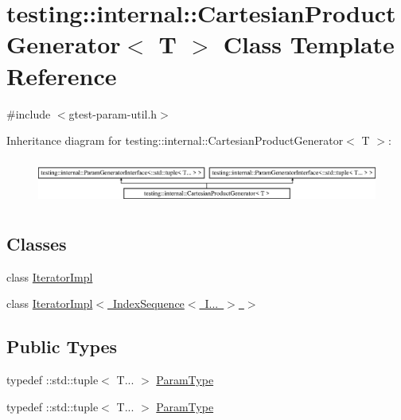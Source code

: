 \hypertarget{classtesting_1_1internal_1_1_cartesian_product_generator}{}\section{testing\+::internal\+::Cartesian\+Product\+Generator$<$ T $>$ Class Template Reference}
\label{classtesting_1_1internal_1_1_cartesian_product_generator}


{\ttfamily \#include $<$gtest-\/param-\/util.\+h$>$}

Inheritance diagram for testing\+::internal\+::Cartesian\+Product\+Generator$<$ T $>$\+:\begin{figure}[H]
\begin{center}
\leavevmode
\includegraphics[height=1.513514cm]{d5/d34/classtesting_1_1internal_1_1_cartesian_product_generator}
\end{center}
\end{figure}
\subsection*{Classes}
\begin{DoxyCompactItemize}
\item 
class \mbox{\hyperlink{classtesting_1_1internal_1_1_cartesian_product_generator_1_1_iterator_impl}{Iterator\+Impl}}
\item 
class \mbox{\hyperlink{classtesting_1_1internal_1_1_cartesian_product_generator_1_1_iterator_impl_3_01_index_sequence_3_01_i_8_8_8_01_4_01_4}{Iterator\+Impl$<$ Index\+Sequence$<$ I... $>$ $>$}}
\end{DoxyCompactItemize}
\subsection*{Public Types}
\begin{DoxyCompactItemize}
\item 
typedef \+::std\+::tuple$<$ T... $>$ \mbox{\hyperlink{classtesting_1_1internal_1_1_cartesian_product_generator_af27131157a9347f0c82420ca081ee7dd}{Param\+Type}}
\item 
typedef \+::std\+::tuple$<$ T... $>$ \mbox{\hyperlink{classtesting_1_1internal_1_1_cartesian_product_generator_af27131157a9347f0c82420ca081ee7dd}{Param\+Type}}
\end{DoxyCompactItemize}
